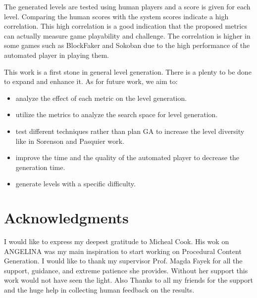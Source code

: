 \documentclass[letterpaper]{article}
\begin{document}
The generated levels are tested using human players and a score is given for each level. Comparing the human scores with the system scores indicate a high correlation. This high correlation is a good indication that the proposed metrics can actually measure game playability and challenge. The correlation is higher in some games such as BlockFaker and Sokoban due to the high performance of the automated player in playing them.\\\par

This work is a first stone in general level generation. There is a plenty to be done to expand and enhance it. As for future work, we aim to:
\begin{itemize}
	\item analyze the effect of each metric on the level generation.
	\item utilize the metrics to analyze the search space for level generation.
	\item test different techniques rather than plan GA to increase the level diversity like in Sorenson and Pasquier work\cite{genericLevelFramework}.
	\item improve the time and the quality of the automated player to decrease the generation time.
	\item generate levels with a specific difficulty.
\end{itemize}

\section{Acknowledgments}
I would like to express my deepest gratitude to Micheal Cook. His wok on ANGELINA was my main inspiration to start working on Procedural Content Generation. I would like to thank my supervisor Prof. Magda Fayek for all the support, guidance, and extreme patience she provides. Without her support this work would not have seen the light. Also Thanks to all my friends for the support and the huge help in collecting human feedback on the results.



\end{document}
